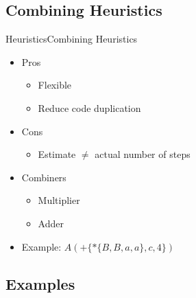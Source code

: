 \subsection{Combining Heuristics}
\begin{frame}{Heuristics}{Combining Heuristics}
    \begin{itemize}
    \item Pros
      \begin{itemize}
      \item Flexible
      \item Reduce code duplication
      \end{itemize}
    \item Cons
      \begin{itemize}
      \item Estimate $\neq$ actual number of steps\\
      \end{itemize}
    \end{itemize}

    \begin{itemize}
    \item Combiners
      \begin{itemize}
      \item Multiplier
      \item Adder
      \end{itemize}

    \item Example: $ A(+\{*\{B,B,a,a\},c,4\})$

    \end{itemize}
\end{frame}

\subsection{Examples}


